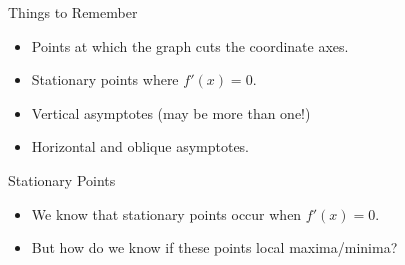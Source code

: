 \documentclass[10pt]{beamer}
\begin{document}
\begin{frame}{Things to Remember}
  \begin{itemize}[<+->]
    \item Points at which the graph cuts the coordinate axes.
    \item Stationary points where $f'(x) = 0$.
    \item Vertical asymptotes (may be more than one!)
    \item Horizontal and oblique asymptotes.
  \end{itemize}
\end{frame}

\begin{frame}{Stationary Points}
  \begin{itemize}[<+->]
    \item We know that stationary points occur when $f'(x) = 0$.
    \item But how do we know if these points local maxima/minima?
  \end{itemize}

  \begin{columns}
    \begin{column}{0.5\textwidth}
    \end{column}

    \begin{column}{0.5\textwidth}
    \end{column}
  \end{columns}
\end{frame}
\end{document}
